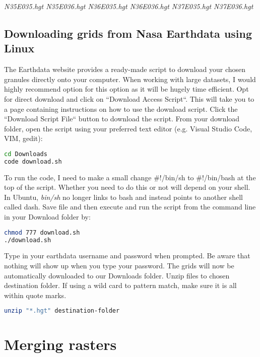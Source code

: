\textit{N35E035.hgt
N35E036.hgt
N36E035.hgt
N36E036.hgt
N37E035.hgt
N37E036.hgt}


\subsection{Downloading grids from Nasa Earthdata using Linux}

The Earthdata website provides a ready-made script to download your chosen granules directly onto your computer. When working with large datasets, I would highly recommend option for this option as it will be hugely time efficient. Opt for direct download and click on ``Download Access Script``. This will take you to a page containing instructions on how to use the download script. Click the ``Download Script File`` button to download the script. From your download folder, open the script using your preferred text editor (e.g. Visual Studio Code, VIM, gedit):

\begin{lstlisting}[language=bash]
cd Downloads
code download.sh
\end{lstlisting}

To run the code, I need to make a small change ${\#}$!/bin/sh to ${\#}$!/bin/bash at the top of the script. Whether you need to do this or not will depend on your shell. In Ubuntu, \textit{bin/sh} no longer links to bash and instead points to another shell called dash. Save file and then execute and run the script from the command line in your Download folder by:

\begin{lstlisting}[language=bash]
chmod 777 download.sh 
./download.sh 
\end{lstlisting}

Type in your earthdata username and password when prompted. Be aware that nothing will show up when you type your password. The grids will now be automatically downloaded to our Downloads folder. Unzip files to chosen destination folder. If using a wild card to pattern match, make sure it is all within quote marks.

\begin{lstlisting}[language=bash]
unzip "*.hgt" destination-folder
\end{lstlisting}


\section{Merging rasters}

